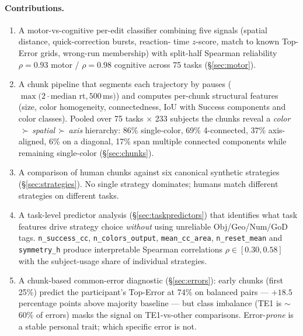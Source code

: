 \documentclass[11pt]{article}
\begin{document}
\paragraph{Contributions.}
\begin{enumerate}[leftmargin=*, topsep=2pt, itemsep=1pt]
  \item A motor-vs-cognitive per-edit classifier combining five
        signals (spatial distance, quick-correction bursts, reaction-
        time $z$-score, match to known Top-Error grids, wrong-run
        membership) with split-half Spearman reliability
        $\rho = 0.93$ motor / $\rho = 0.98$ cognitive across 75
        tasks (\S\ref{sec:motor}).
  \item A chunk pipeline that segments each trajectory by pauses
        ($\max(2\cdot\text{median rt}, 500\,$ms$)$) and computes
        per-chunk structural features (size, color homogeneity,
        connectedness, IoU with Success components and color
        classes). Pooled over 75 tasks $\times$ 233 subjects the
        chunks reveal a \emph{color$\,\succ\,$spatial$\,\succ\,$axis}
        hierarchy: 86\% single-color, 69\% 4-connected, 37\% axis-
        aligned, 6\% on a diagonal, 17\% span multiple connected
        components while remaining single-color
        (\S\ref{sec:chunks}).
  \item A comparison of human chunks against six canonical synthetic
        strategies (\S\ref{sec:strategies}). No single strategy
        dominates; humans match different strategies on different
        tasks.
  \item A task-level predictor analysis
        (\S\ref{sec:taskpredictors}) that identifies what task
        features drive strategy choice \emph{without} using
        unreliable Obj/Geo/Num/GoD tags.
        \texttt{n\_success\_cc}, \texttt{n\_colors\_output},
        \texttt{mean\_cc\_area}, \texttt{n\_reset\_mean} and
        \texttt{symmetry\_h} produce interpretable Spearman
        correlations $\rho \in [0.30, 0.58]$ with the subject-usage
        share of individual strategies.
  \item A chunk-based common-error diagnostic
        (\S\ref{sec:errors}): early chunks (first 25\%) predict the
        participant's Top-Error at 74\% on balanced pairs ---
        $+18.5$ percentage points above majority baseline --- but
        class imbalance (TE1 is $\sim$60\% of errors) masks the
        signal on TE1-vs-other comparisons. Error-\emph{prone} is a
        stable personal trait; which specific error is not.
\end{enumerate}
\end{document}

